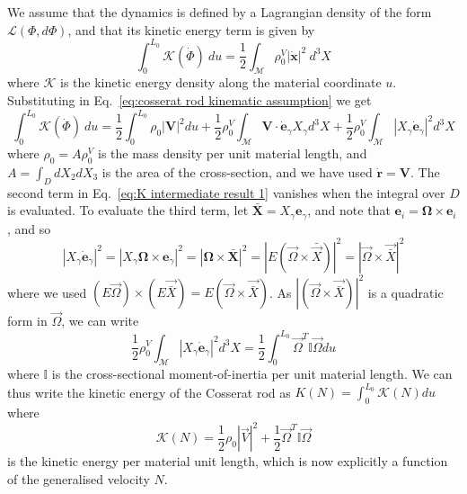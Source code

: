We assume that the dynamics is defined by a Lagrangian density of the form $\mathcal{L}(\Phi, d \Phi)$, and that its kinetic energy term is given by
\begin{equation} \label{eq:lagrangian of tube}
\int_0^{L_0} \mathcal{K}(\dot{\Phi})\ du = \frac{1}{2} \int_\mathscr{M} \rho^{V}_0 | \dot{\mathbf{x}} |^2\ d^3 X
\end{equation} 
where $\mathcal{K}$ is the kinetic energy density along the material coordinate $u$. Substituting in Eq.~\ref{eq:cosserat rod kinematic assumption} we get
\begin{equation} \label{eq:K intermediate result 1}
\int_0^{L_0} \mathcal{K}(\dot{\Phi})\ du = \frac{1}{2} \int_0^{L_0} \rho_0 |\mathbf{V}|^2 du + \frac{1}{2} \rho_0^V \int_\mathscr{M} \mathbf{V} \cdot \dot{\mathbf{e}}_\gamma X_\gamma d^3 X  + \frac{1}{2} \rho_0^V \int_\mathscr{M} |X_\gamma \dot{\mathbf{e}}_\gamma|^2 d^3 X
\end{equation} 
where $\rho_0 = A \rho^{V}_0$ is the mass density per unit material length, and $A = \int_D d X_2 dX_3$ is the area of the cross-section, and we have used $\dot{\mathbf{r}} = \mathbf{V}$. The second term in Eq.~\ref{eq:K intermediate result 1} vanishes when the integral over $D$ is evaluated. To evaluate the third term, let $\bar{\mathbf{X}} = X_\gamma \mathbf{e}_\gamma$, and note that $\mathbf{e}_i = \boldsymbol{\Omega} \times \mathbf{e}_i$, and so
\begin{equation}
|X_\gamma \dot{\mathbf{e}}_\gamma|^2 = |X_\gamma \boldsymbol{\Omega} \times \mathbf{e}_\gamma|^2 = |\boldsymbol{\Omega} \times \bar{\mathbf{X}}|^2 = |E (\vec{\Omega} \times \bar{\vec{X}})|^2 = |\vec{\Omega} \times \vec{\bar{X}}|^2
\end{equation}
where we used $(E\vec{\Omega}) \times (E\vec{\bar{X}}) = E (\vec{\Omega} \times \vec{\bar{X}})$. As $|(\vec{\Omega} \times \vec{\bar{X}})|^2$ is a quadratic form in $\vec{\Omega}$, we can write
\begin{equation}
\frac{1}{2} \rho_0^V \int_\mathscr{M} |X_\gamma \dot{\mathbf{e}}_\gamma|^2 d^3 X = \frac{1}{2} \int_0^{L_0} \vec{\Omega}^T \mathbb{I} \vec{\Omega} du
\end{equation}
where $\mathbb{I}$ is the cross-sectional moment-of-inertia per unit material length. We can thus write the kinetic energy of the Cosserat rod as $K(N) = \int_0^{L_0} \mathcal{K}(N) du$ where 
\begin{equation} \label{eq:reduced kinetic energy}
\mathcal{K}(N)  = \frac{1}{2} \rho_0 |\vec{V}|^2 +  \frac{1}{2} \vec{\Omega}^T \mathbb{I} \vec{\Omega}
\end{equation}
is the kinetic energy per material unit length, which is now explicitly a function of the generalised velocity $N$.

